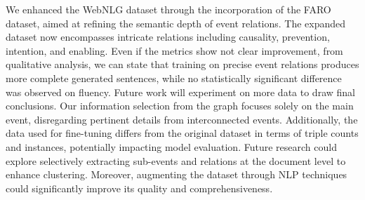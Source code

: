 \documentclass[
hf, %
]{ceurart}
\begin{document}
We enhanced the WebNLG dataset through the incorporation of the FARO dataset, aimed at refining the semantic depth of event relations. The expanded dataset now encompasses intricate relations including causality, prevention, intention, and enabling.
Even if the metrics show not clear improvement, from qualitative analysis, we can state that training on precise event relations produces more complete generated sentences, while no statistically significant difference was observed on fluency. Future work will experiment on more data to draw final conclusions.
Our information selection from the graph focuses solely on the main event, disregarding pertinent details from interconnected events. Additionally, the data used for fine-tuning differs from the original dataset in terms of triple counts and instances, potentially impacting model evaluation. Future research could explore selectively extracting sub-events and relations at the document level to enhance clustering. Moreover, augmenting the dataset through NLP techniques could significantly improve its quality and comprehensiveness.
\end{document}
